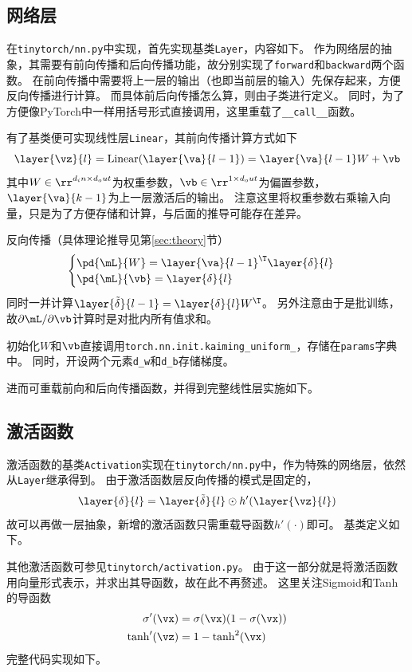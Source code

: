 \documentclass[logo,reportComp]{thesis}
\begin{document}
\subsection{网络层}
在\verb'tinytorch/nn.py'中实现，首先实现基类\verb'Layer'，内容如下。
作为网络层的抽象，其需要有前向传播和后向传播功能，故分别实现了\verb'forward'和\verb'backward'两个函数。
在前向传播中需要将上一层的输出（也即当前层的输入）先保存起来，方便反向传播进行计算。
而具体前后向传播怎么算，则由子类进行定义。
同时，为了方便像PyTorch中一样用括号形式直接调用，这里重载了\verb'__call__'函数。


有了基类便可实现线性层\verb'Linear'，其前向传播计算方式如下
\[\layer{\vz}{l}=\mathrm{Linear}(\layer{\va}{l-1}) = \layer{\va}{l-1} W + \vb\]
其中$W\in\rr^{d_in\times d_out}$为权重参数，$\vb\in\rr^{1\times d_out}$为偏置参数，$\layer{\va}{k-1}$为上一层激活后的输出。
注意这里将权重参数右乘输入向量，只是为了方便存储和计算，与后面的推导可能存在差异。

反向传播（具体理论推导见第\ref{sec:theory}节）
\[\begin{cases}
\pd{\mL}{W}=\layer{\va}{l-1}^\T\layer{\delta}{l}\\
\pd{\mL}{\vb}=\layer{\delta}{l}
\end{cases}\]
同时一并计算$\layer{\tilde{\delta}}{l-1}=\layer{\delta}{l}W^\T$。
另外注意由于是批训练，故$\partial\mL/\partial \vb$计算时是对批内所有值求和。

初始化$W$和$\vb$直接调用\verb'torch.nn.init.kaiming_uniform_'，存储在\verb'params'字典中。
同时，开设两个元素\verb'd_w'和\verb'd_b'存储梯度。

进而可重载前向和后向传播函数，并得到完整线性层实施如下。


\subsection{激活函数}
激活函数的基类\verb'Activation'实现在\verb'tinytorch/nn.py'中，作为特殊的网络层，依然从\verb'Layer'继承得到。
由于激活函数层反向传播的模式是固定的，
\[\layer{\delta}{l}=\layer{\tilde{\delta}}{l}\odot h'(\layer{\vz}{l})\]
故可以再做一层抽象，新增的激活函数只需重载导函数$h'(\cdot)$即可。
基类定义如下。


其他激活函数可参见\verb'tinytorch/activation.py'。
由于这一部分就是将激活函数用向量形式表示，并求出其导函数，故在此不再赘述。
这里关注Sigmoid和Tanh的导函数
\[\begin{aligned}
\sigma'(\vx)&=\sigma(\vx)(1-\sigma(\vx))\\
\tanh'(\vz)&=1-\tanh^2(\vx)
\end{aligned}\]
完整代码实现如下。

\end{document}
